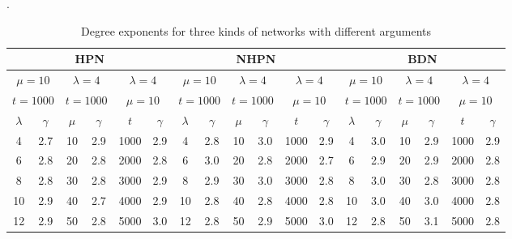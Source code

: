 \documentclass[final]{IEEEtran}
\begin{document}
\begin{table}\tiny
\begin{center}
\caption{\label{tx} Degree exponents for three kinds of networks
with different arguments}.
\begin{tabular}{|c|c|c|c|c|c|c|c|c|c|c|c|c|c|c|c|c|c|}
 \hline
   \multicolumn{6}{|c|}{HPN}&\multicolumn{6}{c|}{NHPN}  &\multicolumn{6}{c|}{BDN}\\
   \hline
\multicolumn{2}{|c|}{$\mu=10$}&\multicolumn{2}{c|}{$\lambda=4$}  &\multicolumn{2}{c|}{$\lambda=4$}&\multicolumn{2}{c|}{$\mu=10$}&\multicolumn{2}{c|}{$\lambda=4$}  &\multicolumn{2}{c|}{$\lambda=4$}&\multicolumn{2}{c|}{$\mu=10$}&\multicolumn{2}{c|}{$\lambda=4$}  &\multicolumn{2}{c|}{$\lambda=4$}\\
 \multicolumn{2}{|c|}{$t=1000$}&\multicolumn{2}{c|}{$t=1000$}  &\multicolumn{2}{c|}{$\mu=10$}&\multicolumn{2}{c|}{$t=1000$}&\multicolumn{2}{c|}{$t=1000$}  &\multicolumn{2}{c|}{$\mu=10$}&\multicolumn{2}{c|}{$t=1000$}&\multicolumn{2}{c|}{$t=1000$}  &\multicolumn{2}{c|}{$\mu=10$}\\
 \hline
$\lambda$ &$\gamma$& $\mu$ &$\gamma$&$t$&$\gamma$& $\lambda$&$\gamma$&$\mu$ &$\gamma$&$t$&$\gamma$&$\lambda$ &$\gamma$&$\mu$ &$\gamma$&$t$&$\gamma$\\
 \hline
  4  &2.7 &10&2.9&1000&2.9&4  &2.8 &10&3.0&1000&2.9 &4  & 3.0&10&2.9&1000&2.9\\
 \hline
 6 &2.8&20&2.8&2000&2.8&6 &3.0&20&2.8&2000&2.7&6 &2.9&20&2.9&2000&2.8\\
 \hline
 8&2.8&30&2.8&3000&2.9& 8&2.9&30&3.0&3000&2.8 & 8&3.0&30&2.8&3000&2.8\\
 \hline
 10 &2.9&40&2.7&4000&2.9&10 &2.8&40&2.8&4000&2.8&10 &3.0&40&3.0&4000&2.8\\
 \hline
  12 &2.9&50&2.8&5000&3.0& 12 &2.8&50&2.9&5000&3.0 &12 &2.8 &50&3.1&5000&2.8\\
 \hline
\end{tabular}
\end{center}
\end{table}


\end{document}
